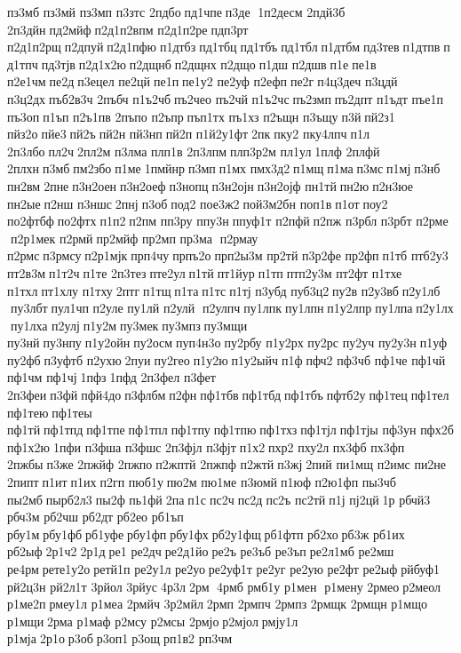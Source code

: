 пз3мб  
пз3мй  
пз3мп  	п3зтс 	2пдбо пд1чпе п3де  1п2десм 
2пдй3б 
2п3дйн пд2мйф п2д1п2впм 
п2д1п2ре пдп3рт 
п2д1п2рщ п2дпуй п2д1пфю п1дтбз пд1тбц пд1тбъ пд1тбл п1дтбм пд3тев п1дтпв пд1тпч пд3тјв п2д1х2ю п2дщнб п2дщнх 	п2дщо п1дш 	п2дшв п1е пе1в 
п2е1чм пе2д п3ецел 	пе2цй пе1п пе1у2 	пе2уф 	п2ефп пе2г п4ц3деч 	п3цдй 
п3ц2дх пъб2в3ч 	2пъбч 
п1ъ2чб пъ2чео 	пъ2чй 
п1ъ2чс пъ2змп пъ2дпт 	п1ъдт 	пъе1п 	пъ3оп п1ъп 
п2ъ1пв 	2пъпо 	п2ъпр пъп1тх 	пъ1хз 	п2ъщн 	п3ъщу п3й пй2з1 	пйз2о пйе3 пй2ъ пй2н 	пй3нп пй2п 
п1й2у1фт 2пк пку2 
пку4лпч п1л 
2п3лбо пл2ч 2пл2м 	п3лма 	плп1в 
2п3лпм плп3р2м 	пл1ул 1плф 	2плфй 	2плхн п3мб пм2збо п1ме 1пмйнр п3мп п1мх 
пмх3д2 п1мщ п1ма п3мс п1мј п3нб 	пн2вм 2пне п3н2оен п3н2оеф п3нопц п3н2ојн п3н2ојф 	пн1тй пн2ю п2н3юе  	пн2ые п2нш 	п3ншс 2пнј п3об под2 
пое3ж2 пой3м2бн 	поп1в п1от поу2 
по2фтбф по2фтх п1п2 п2пм 	пп3ру 	ппу3н ппуф1т 	п2пфй п2пж 	п3рбл 	п3рбт 
п2рме  п2р1мек 	п2рмй пр2мйф 	пр2мп 
пр3ма  п2рмау 	п2рмс п3рмсу п2р1мјк прп4чу прпъ2о прп2ы3м 	пр2тй 
п3р2фе 	пр2фп п1тб 
птб2у3 
пт2в3м п1т2ч п1те 
2п3тез пте2ул п1тй пт1йур п1тп птп2у3м 	пт2фт 	п1тхе 	п1тхл пт1хлу 	п1тху 2птг п1тщ п1та п1тс п1тј 	п3убд 
пуб3ц2 пу2в 
п2у3вб п2у1лб  пу3лбт пул1чп 	п2уле 	пу1лй 
п2улй  п2улпч пу1лпк пу1лпн п1у2лпр пу1лпа п2у1лх  пу1лха 	п2улј п1у2м пу3мек пу3мпз пу3мщи 	пу3нй пу3нпу п1у2ойн пу2осм пуп4н3о пу2рбу 
п1у2рх 	пу2рс 	пу2уч 
пу2у3н п1уф 	пу2фб п3уфтб 	п2ухю 2пуи пу2гео п1у2ю п1у2ыйч п1ф пфч2 	пф3чб 	пф1че 	пф1чй 	пф1чм 	пф1чј 1пфз 1пфд 
2п3фел 	п3фет 
2п3феи п3фй пфй4до п3флбм п2фн пф1тбв пф1тбд пф1тбъ пфтб2у пф1тец пф1тел пф1тею пф1теы 	пф1тй пф1тпд пф1тпе пф1тпл пф1тпу пф1тпю пф1тхз пф1тјл пф1тјы 	пф3ун 	пфх2б 
пф1х2ю 1пфи 	п3фша 	п3фшс 
2п3фјл 	п3фјт п1х2 пхр2 	пху2л 	пх3фб 	пх3фп 	2пжбы п3же 	2пжйф 	2пжпо п2жптй 	2пжпф 	п2жтй п3жј 2пий 	пи1мщ 	п2имс 	пи2не 	2пипт п1ит п1их п2гп 	пюб1у пю2м 	пю1ме 	п3юмй п1юф 
п2ю1фп 	пы3чб 	пы2мб пырб2л3 пы2ф 	пь1фй 2па п1с пс2ч пс2д пс2ъ 	пс2тй п1ј 	пј2цй 1р 	рбчй3 	рбч3м 	рб2чш 	рб2дт 	рб2ео 	рб1ъп 	рбу1м рбу1фб рб1уфе рбу1фп рбу1фх рб2у1фщ рб1фтп 	рб2хо рб3ж 	рб1их 	рб2ыф 2р1ч2 2р1д ре1 	ре2дч ре2д1йо ре2ъ 	ре3ъб 	ре3ъп ре2л1мб 	ре2мш 	ре4рм рете1у2о ретй1п 
ре2у1л 	ре2уо ре2уф1т 	ре2уг 	ре2ую 	ре2фт 	ре2ыф рйбуф1 
рй2ц3н 
рй2л1т 	3рйол 	3рйус 4р3л 2рм  4рмб  	рмб1у 
р1мен  р1мену 	2рмео р2меол 
р1ме2п рмеу1л 	р1меа 	2рмйч 
3р2мйл 2рмп  	2рмпч 	2рмпз 	2рмщк 	2рмщн 	р1мщо 	р1мщи 2рма  	р1маф 	р2мсу 	р2мсы 	2рмјо р2мјол рмју1л 	р1мја 2р1о р3об р3оп1 р3ощ рп1в2 	рп3чм 
